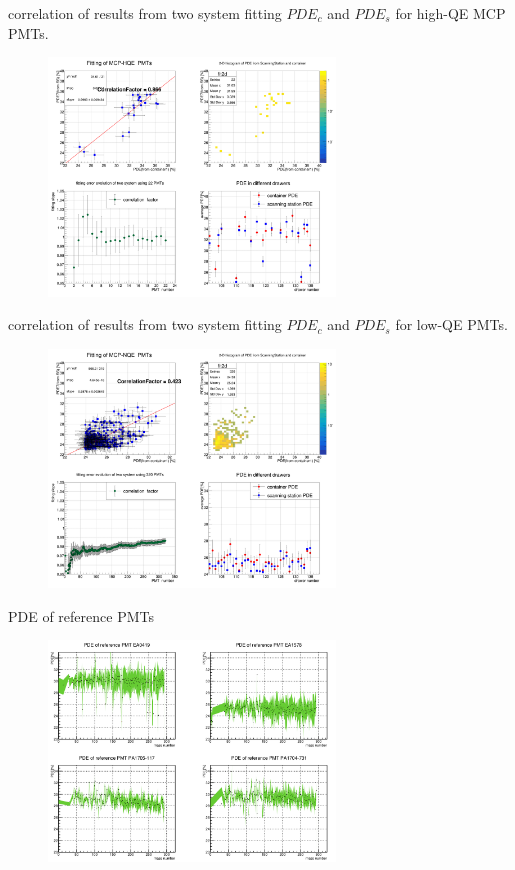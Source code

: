 \documentclass[11pt,compress,xcolor=x11names,UTF8]{beamer}
\begin{document}
\begin{frame}{correlation of results from two system}
fitting $PDE_c$ and $PDE_s$ for high-QE MCP PMTs.
\begin{figure}
\centering
\includegraphics[width=0.68\textwidth]{fit_mcp_hqe_noint}
\end{figure}
\end{frame}
\begin{frame}{correlation of results from two system}
fitting $PDE_c$ and $PDE_s$ for low-QE PMTs.
\begin{figure}
\centering
\includegraphics[width=0.68\textwidth]{fit_mcp_nqe_noint}
\end{figure}
\end{frame}
\begin{frame}{PDE of reference PMTs}
\begin{figure}
\centering
\includegraphics[width=0.68\textwidth]{ref_sta}
\end{figure}
\end{frame}
\end{document}
